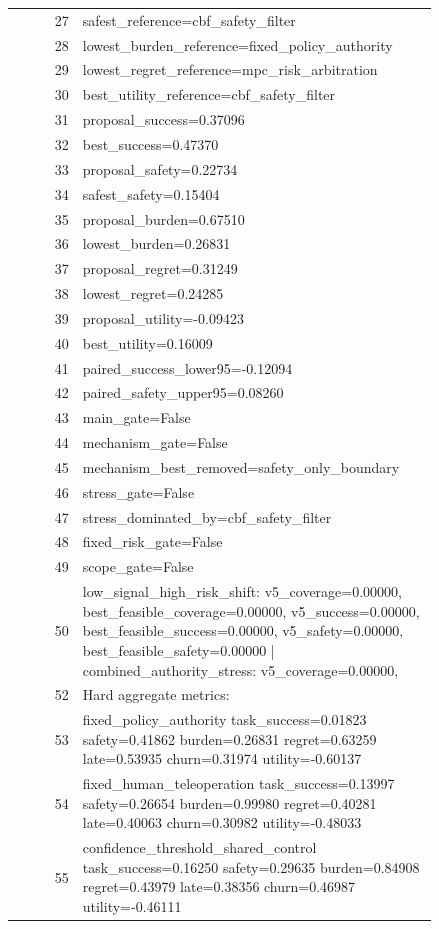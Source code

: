 \documentclass{article}
\begin{document}
\begin{center}
\begin{longtable}{rp{0.84\linewidth}}
27 & safest\_reference=cbf\_safety\_filter\\
28 & lowest\_burden\_reference=fixed\_policy\_authority\\
29 & lowest\_regret\_reference=mpc\_risk\_arbitration\\
30 & best\_utility\_reference=cbf\_safety\_filter\\
31 & proposal\_success=0.37096\\
32 & best\_success=0.47370\\
33 & proposal\_safety=0.22734\\
34 & safest\_safety=0.15404\\
35 & proposal\_burden=0.67510\\
36 & lowest\_burden=0.26831\\
37 & proposal\_regret=0.31249\\
38 & lowest\_regret=0.24285\\
39 & proposal\_utility=-0.09423\\
40 & best\_utility=0.16009\\
41 & paired\_success\_lower95=-0.12094\\
42 & paired\_safety\_upper95=0.08260\\
43 & main\_gate=False\\
44 & mechanism\_gate=False\\
45 & mechanism\_best\_removed=safety\_only\_boundary\\
46 & stress\_gate=False\\
47 & stress\_dominated\_by=cbf\_safety\_filter\\
48 & fixed\_risk\_gate=False\\
49 & scope\_gate=False\\
50 & low\_signal\_high\_risk\_shift: v5\_coverage=0.00000, best\_feasible\_coverage=0.00000, v5\_success=0.00000, best\_feasible\_success=0.00000, v5\_safety=0.00000, best\_feasible\_safety=0.00000 | combined\_authority\_stress: v5\_coverage=0.00000, \\
52 & Hard aggregate metrics:\\
53 & fixed\_policy\_authority task\_success=0.01823 safety=0.41862 burden=0.26831 regret=0.63259 late=0.53935 churn=0.31974 utility=-0.60137\\
54 & fixed\_human\_teleoperation task\_success=0.13997 safety=0.26654 burden=0.99980 regret=0.40281 late=0.40063 churn=0.30982 utility=-0.48033\\
55 & confidence\_threshold\_shared\_control task\_success=0.16250 safety=0.29635 burden=0.84908 regret=0.43979 late=0.38356 churn=0.46987 utility=-0.46111\\

\end{longtable}
\end{center}
\end{document}

